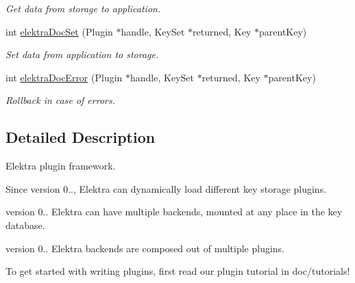 \begin{DoxyCompactItemize}
\begin{DoxyCompactList}\small\item\em Get data from storage to application. \end{DoxyCompactList}\item 
int \hyperlink{group__plugin_gae65781a1deb34efc79c8cb9d9174842c}{elektra\+Doc\+Set} (Plugin $\ast$handle, Key\+Set $\ast$returned, Key $\ast$parent\+Key)
\begin{DoxyCompactList}\small\item\em Set data from application to storage. \end{DoxyCompactList}\item 
int \hyperlink{group__plugin_gad74b35f558ac7c3262f6069c5c47dc79}{elektra\+Doc\+Error} (Plugin $\ast$handle, Key\+Set $\ast$returned, Key $\ast$parent\+Key)
\begin{DoxyCompactList}\small\item\em Rollback in case of errors. \end{DoxyCompactList}\end{DoxyCompactItemize}


\subsection{Detailed Description}
Elektra plugin framework. 

\begin{DoxySince}{Since}
version 0.., Elektra can dynamically load different key storage plugins.

version 0.. Elektra can have multiple backends, mounted at any place in the key database.

version 0.. Elektra backends are composed out of multiple plugins.
\end{DoxySince}
To get started with writing plugins, first read our plugin tutorial in doc/tutorials!


